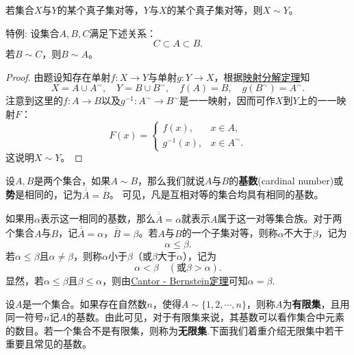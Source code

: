 \documentclass[lang=cn,newtx,10pt,scheme=chinese]{../Template/elegantbook}
\begin{document}
\begin{theorem}\label{theorem:Cantor - Bernstein定理}
若集合\(X\)与\(Y\)的某个真子集对等，\(Y\)与\(X\)的某个真子集对等，则\(X\sim Y\)。
\end{theorem}
\begin{note}
  特例:
设集合\(A,B,C\)满足下述关系：
\[C\subset A\subset B.\]
若\(B\sim C\)，则\(B\sim A\)。
\end{note}
\begin{proof}
  由题设知存在单射\(f:X\rightarrow Y\)与单射\(g:Y\rightarrow X\)，根据\hyperref[lemma:映射分解定理]{映射分解定理}知
\[X = A\cup A^{\sim}, \quad Y = B\cup B^{\sim}, \quad f(A) = B, \quad g(B^{\sim}) = A^{\sim}.\]
注意到这里的\(f:A\rightarrow B\)以及\(g^{-1}:A^{\sim}\rightarrow B^{\sim}\)是一一映射，因而可作\(X\)到\(Y\)上的一一映射\(F\)：
\[F(x)=
\begin{cases}
f(x), & x\in A, \\
g^{-1}(x), & x\in A^{\sim}.
\end{cases}
\]
这说明\(X\sim Y\)。
\end{proof}

\begin{definition}[集合的基数(或势)]\label{definition:集合的基数(或势)}
  设\(A,B\)是两个集合，如果\(A\sim B\)，那么我们就说\(A\)与\(B\)的\textbf{基数}(cardinal number)或\textbf{势}是相同的，记为\(\overline{\overline{A}}=\overline{\overline{B}}\)。
  可见，凡是互相对等的集合均具有相同的基数。
  
  如果用\(\alpha\)表示这一相同的基数，那么\(\overline{\overline{A}}=\alpha\)就表示\(A\)属于这一对等集合族。对于两个集合\(A\)与\(B\)，记\(\overline{\overline{A}}=\alpha\)，\(\overline{\overline{B}}=\beta\)。若\(A\)与\(B\)的一个子集对等，则称\(\alpha\)不大于\(\beta\)，记为
\[\alpha\leqslant\beta.\]
若\(\alpha\leqslant\beta\)且\(\alpha\neq\beta\)，则称\(\alpha\)小于\(\beta\)（或\(\beta\)大于\(\alpha\)），记为
\[\alpha<\beta\quad(\text{或}\beta>\alpha).\]
显然，若\(\alpha\leqslant\beta\)且\(\beta\leqslant\alpha\)，则由\hyperref[theorem:Cantor - Bernstein定理]{Cantor - Bernstein定理}可知\(\alpha=\beta\).
\end{definition}

\begin{definition}[有限集与无限集]\label{definition:有限集与无限集}
设\(A\)是一个集合。如果存在自然数\(n\)，使得\(A\sim\{1,2,\cdots,n\}\)，则称\(A\)为\textbf{有限集}，且用同一符号\(n\)记\(A\)的基数。由此可见，对于有限集来说，其基数可以看作集合中元素的数目。若一个集合不是有限集，则称为\textbf{无限集}.下面我们着重介绍无限集中若干重要且常见的基数。
\end{definition}
\end{document}
